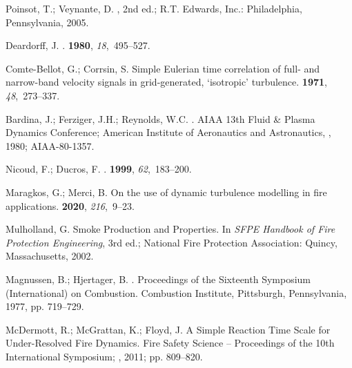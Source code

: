 \documentclass[atmosphere,article,accept,moreauthors,pdftex]{Definitions/mdpi}
\begin{document}
\begin{thebibliography}{999}
Poinsot, T.; Veynante, D.
, 2nd ed.; R.T. Edwards,
  Inc.: Philadelphia, Pennsylvania,  2005.

Deardorff, J.
.
 {\bf 1980}, {\em 18},~495--527.

Comte-{B}ellot, G.; Corrsin, S.
\newblock Simple {Eulerian} time correlation of full- and narrow-band velocity
  signals in grid-generated, `isotropic' turbulence.
 {\bf 1971}, {\em 48},~273--337.

Bardina, J.; Ferziger, J.H.; Reynolds, W.C.
.
\newblock  AIAA 13th Fluid \& Plasma Dynamics Conference; American Institute of
  Aeronautics and Astronautics, ,  1980; AIAA-80-1357.

Nicoud, F.; Ducros, F.
.
 {\bf 1999}, {\em
  62},~183--200.

Maragkos, G.; Merci, B.
\newblock On the use of dynamic turbulence modelling in fire applications.
 {\bf 2020}, {\em 216},~9--23.

Mulholland, G.
\newblock Smoke Production and Properties. In {\em SFPE Handbook of Fire
  Protection Engineering}, 3rd ed.; National Fire Protection Association:
  Quincy, Massachusetts,  2002.

Magnussen, B.; Hjertager, B.
.
\newblock  Proceedings of the Sixteenth Symposium (International) on
  Combustion. Combustion Institute, Pittsburgh, Pennsylvania,  1977, pp.
  719--729.

McDermott, R.; McGrattan, K.; Floyd, J.
\newblock A Simple Reaction Time Scale for Under-Resolved Fire Dynamics.
\newblock  Fire Safety Science -- Proceedings of the 10th International
  Symposium; ,  2011; pp. 809--820.


\end{thebibliography}
\end{document}
